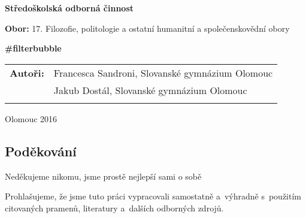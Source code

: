\pagestyle{empty}
\begin{center}

\medskip

\vfill
{\bfseries\Large{Středoškolská odborná činnost}}

\medskip

{{\bfseries Obor: } 17. Filozofie, politologie a ostatní humanitní a společenskovědní obory}
\vfill


\vspace{20mm}

{\LARGE\bfseries \#filterbubble}

\vfill

\begin{tabular}{ll}
\bfseries Autoři: & Francesca Sandroni,\hspace{0.153cm} Slovanské gymnázium Olomouc\\
                  & Jakub Dostál, Slovanské gymnázium Olomouc\\
\noalign{\vspace{2mm}}
\end{tabular}

\vfill
Olomouc 2016
\end{center}


\newpage
\openright

\noindent
\subsection*{Poděkování}
\noindent Neděkujeme nikomu, jsme prostě nejlepší sami o sobě



\newpage

\noindent
Prohlašujeme, že jsme tuto práci vypracovali samostatně a~výhradně
s~použitím citovaných pramenů, literatury a~dalších odborných zdrojů.

